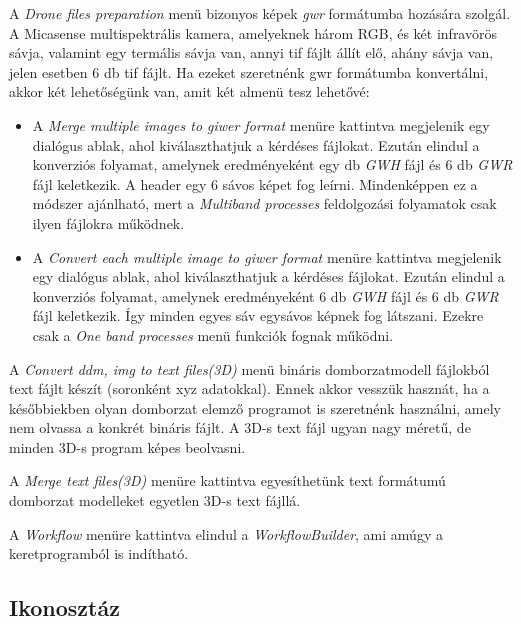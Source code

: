\documentclass[a4paper,12pt]{article}
\begin{document}
A \textit{Drone files preparation} menü bizonyos képek \textit{gwr} formátumba hozására szolgál. A Micasense multispektrális kamera, amelyeknek három RGB, és két infravörös sávja, valamint egy termális sávja van, annyi tif fájlt állít elő, ahány sávja van, jelen esetben 6 db tif fájlt. Ha ezeket szeretnénk gwr formátumba konvertálni, akkor két lehetőségünk van, amit két almenü tesz lehetővé:
\begin{itemize}
	\item A \textit{Merge multiple images to giwer format} menüre kattintva megjelenik egy dialógus ablak, ahol kiválaszthatjuk a kérdéses fájlokat. Ezután elindul a konverziós folyamat, amelynek eredményeként egy db \textit{GWH} fájl és 6 db \textit{GWR} fájl keletkezik. A header egy 6 sávos képet fog leírni. Mindenképpen ez a módszer ajánlható, mert a \textit{Multiband processes} feldolgozási folyamatok csak ilyen fájlokra működnek.
	
	\item A \textit{Convert each multiple image to giwer format} menüre kattintva megjelenik egy dialógus ablak, ahol kiválaszthatjuk a kérdéses fájlokat. Ezután elindul a konverziós folyamat, amelynek eredményeként 6 db \textit{GWH} fájl és 6 db \textit{GWR} fájl keletkezik. Így minden egyes sáv egysávos képnek fog látszani. Ezekre csak a \textit{One band processes} menü funkciók fognak működni.
\end{itemize}

A \textit{Convert ddm, img to text files(3D)} menü bináris domborzatmodell fájlokból text fájlt készít (soronként xyz adatokkal). Ennek akkor vesszük hasznát, ha a későbbiekben olyan domborzat elemző programot is szeretnénk használni, amely nem olvassa a konkrét bináris fájlt. A 3D-s text fájl ugyan nagy méretű, de minden 3D-s program képes beolvasni.

A \textit{Merge text files(3D)} menüre kattintva egyesíthetünk text formátumú domborzat modelleket egyetlen 3D-s text fájllá.

A \textit{Workflow} menüre kattintva elindul a \textit{WorkflowBuilder}, ami amúgy a keretprogramból is indítható.

\subsection{Ikonosztáz}
\end{document}
